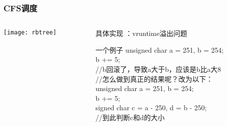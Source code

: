 \begin{frame}
	\frametitle{CFS调度}
	\begin{columns}
		\begin{column}{.4\textwidth}
			\Large \centering
			
			\texttt{[image: rbtree]}
		\end{column}
		
		\begin{column}{.6\textwidth}
			
			具体实现 ：vruntime溢出问题
			
\begin{block}{一个例子}
unsigned char a = 251, b = 254;  \\
b += 5; \\
//b回滚了，导致a大于b，应该是b比a大8\\
 
//怎么做到真正的结果呢？改为以下：\\
unsigned char a = 251, b = 254;\\
b += 5; \\
signed char c = a - 250, d = b - 250; \\
//到此判断c和d的大小
\end{block}			

		\end{column}
	\end{columns}
\end{frame}

